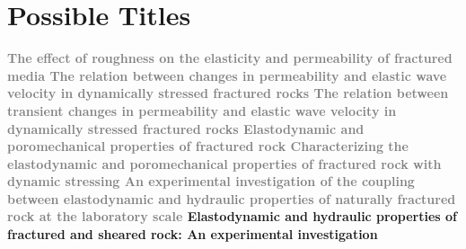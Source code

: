 \documentclass[letterpaper,10pt]{article}
\begin{document}

\section{Possible Titles}
\begin{flushleft}
	\begin{Large}
	\textbf{\textcolor{gray}{The effect of roughness on the elasticity and permeability of fractured media
	\linebreak\linebreak\linebreak
	The relation between changes in permeability and elastic wave velocity in dynamically stressed fractured rocks
	\linebreak\linebreak\linebreak
	The relation between transient changes in permeability and elastic wave velocity in dynamically stressed fractured rocks
	\linebreak\linebreak\linebreak
	Elastodynamic and poromechanical properties of fractured rock
	\linebreak\linebreak\linebreak
	Characterizing the elastodynamic and poromechanical properties of fractured rock with dynamic stressing \linebreak\linebreak\linebreak
	An experimental investigation of the coupling between elastodynamic and hydraulic properties of naturally fractured rock at the laboratory scale} \linebreak\linebreak\linebreak
	Elastodynamic and hydraulic properties of fractured and sheared rock: An experimental investigation}
\end{Large}
\end{flushleft}
\end{document}
